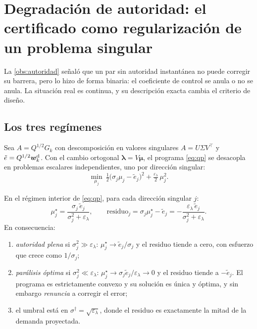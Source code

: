 \section{Degradación de autoridad: el certificado como regularización de un problema singular}
\label{sec:autoridad}

La \cref{obs:autoridad} señaló que un par sin autoridad instantánea no puede
corregir su barrera, pero lo hizo de forma binaria: el coeficiente de control se
anula o no se anula. La situación real es continua, y su descripción exacta
cambia el criterio de diseño.

\subsection{Los tres regímenes}

Sea $A=Q^{1/2}G_k$ con descomposición en valores singulares $A=U\Sigma V^{\!\top}$
y $\tilde e=Q^{1/2}\bm{w}^{\mathrm{d}}_k$. Con el cambio ortogonal $\bm\lambda=V\bm\mu$, el
programa \eqref{eq:qp} se desacopla en problemas escalares independientes, uno
por dirección singular:
\begin{equation}
  \min_{\mu_j}\ \tfrac12\bigl(\sigma_j\mu_j-\tilde e_j\bigr)^{2}
  +\tfrac{\varepsilon_\lambda}{2}\,\mu_j^{2}.
  \label{eq:escalar}
\end{equation}

\begin{teorema}
\label{th:autoridad}
En el régimen interior de \eqref{eq:qp}, para cada dirección singular $j$:
\[
  \mu_j^{\star}=\frac{\sigma_j\,\tilde e_j}{\sigma_j^{2}+\varepsilon_\lambda},
  \qquad
  \text{residuo}_j=\sigma_j\mu_j^{\star}-\tilde e_j
  =-\frac{\varepsilon_\lambda\,\tilde e_j}{\sigma_j^{2}+\varepsilon_\lambda}.
\]
En consecuencia:
\begin{enumerate}[label=(\roman*),leftmargin=2.2em,topsep=0.2em,itemsep=0.15em]
  \item \emph{autoridad plena} si $\sigma_j^{2}\gg\varepsilon_\lambda$:
  $\mu_j^{\star}\to\tilde e_j/\sigma_j$ y el residuo tiende a cero, con esfuerzo
  que crece como $1/\sigma_j$;
  \item \emph{parálisis óptima} si $\sigma_j^{2}\ll\varepsilon_\lambda$:
  $\mu_j^{\star}\to\sigma_j\tilde e_j/\varepsilon_\lambda\to0$ y el residuo
  tiende a $-\tilde e_j$. El programa es estrictamente convexo y su solución es
  única y óptima, y sin embargo \emph{renuncia} a corregir el error;
  \item el umbral está en $\sigma^{\dagger}=\sqrt{\varepsilon_\lambda}$, donde el
  residuo es exactamente la mitad de la demanda proyectada.
\end{enumerate}
\end{teorema}

